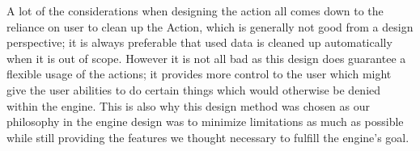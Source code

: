 A lot of the considerations when designing the action all comes down
to the reliance on user to clean up the Action, which is generally
not good from a design perspective; it is always preferable that used
data is cleaned up automatically when it is out of scope. However
it is not all bad as this design does guarantee a flexible usage of
the actions; it provides more control to the user which might give
the user abilities to do certain things which would otherwise be denied
within the engine. This is also why this design method was chosen
as our philosophy in the engine design was to minimize limitations
as much as possible while still providing the features we thought
necessary to fulfill the engine's goal.
